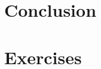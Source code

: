 \documentclass{article}
\begin{document}
%

\section{Conclusion}\label{section:conclusion}




%




\appendix

\section{Exercises}


\end{document}
